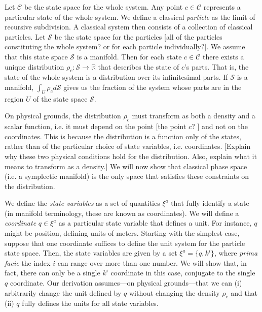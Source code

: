 \documentclass[letterpaper]{article}
\begin{document}
Let $\mathcal{C}$ be the state space for the whole system. Any point $c \in \mathcal{C}$ represents a particular state of the whole system. We define a classical \textit{particle} as the limit of recursive subdivision. A classical system then consists of a collection of classical particles. Let $\mathcal{S}$ be the state space for the particles [all of the particles constituting the whole system? or for each particle individually?]. We assume that this state space $\mathcal{S}$ is a manifold. Then for each state $c \in \mathcal{C}$ there exists a unique distribution $\rho_c : \mathcal{S} \to \mathbb{R} $ that describes the state of $c$'s parts. That is, the state of the whole system is a distribution over its infinitesimal parts. If $\mathcal{S}$ is a manifold, $\int_U \rho_c d\mathcal{S}$ gives us the fraction of the system whose parts are in the region $U$ of the state space $\mathcal{S}$. 

On physical grounds, the distribution $\rho_c$ must transform as both a density and a scalar function, i.e. it must depend on the point [the point $c $? ] and not on the coordinates. This is because the distribution is a function only of the states, rather than of the particular choice of state variables, i.e. coordinates. [Explain why these two physical conditions hold for the distribution. Also, explain what it means to transform as a density.] We will now show that classical phase space (i.e. a symplectic manifold) is the only space that satisfies these constraints on the distribution. 

We define the \textit{state variables} as a set of quantities $\xi^a$ that fully identify a state (in manifold terminology, these are known as coordinates). We will define a \textit{coordinate} $q \in \xi^a$ as a particular state variable that defines a unit. For instance, $q$ might be position, defining units of meters. Starting with the simplest case, suppose that one coordinate suffices to define the unit system for the particle state space. Then, the state variables are given by a set $\xi^a = \{ q, k^i \}$, where \textit{prima facie} the index $i$ can range over more than one number. We will show that, in fact, there can only be a single $k^i$ coordinate in this case, conjugate to the single $q$ coordinate. Our derivation assumes---on physical grounds---that we can (i) arbitrarily change the unit defined by $q$ without changing the density $\rho_c$ and that (ii) $q$ fully defines the units for all state variables. 
\end{document}
